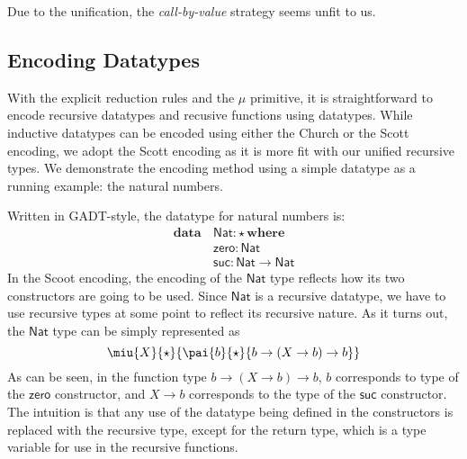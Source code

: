 Due to the unification, the \emph{call-by-value} strategy seems unfit to us. 

\subsection{Encoding Datatypes}


\newcommand{\Nat}{\mathsf{Nat}} \newcommand{\zero}{\mathsf{zero}}
\newcommand{\suc}{\mathsf{suc}} \newcommand{\plus}{\mathsf{plus}}
\newcommand{\List}{\mathsf{List}} \newcommand{\nil}{\mathsf{nil}}
\newcommand{\cons}{\mathsf{cons}}
\newcommand{\length}{\mathsf{length}}
\newcommand{\case}{\mathbf{case}} \newcommand{\of}{\mathbf{of}}
\newcommand{\data}{\mathbf{data}} \newcommand{\where}{\mathbf{where}}
\newcommand{\letbb}{\mathbf{let}} \newcommand{\inb}{\mathbf{in}}

With the explicit reduction rules and the $\mu$ primitive, it is straightforward to encode recursive datatypes and recusive functions using datatypes. While inductive datatypes can be encoded using either the Church or the Scott encoding, we adopt the Scott encoding as it is more fit with our unified recursive types. We demonstrate the encoding method using a simple datatype as a running example: the natural numbers.

Written in GADT-style, the datatype for natural numbers is:
\begin{align*}
  \data\,&\Nat : \star\,\where \\
         &\zero : \Nat \\
         &\suc : \Nat \rightarrow \Nat
\end{align*}
In the Scoot encoding, the encoding of the $\Nat$ type reflects how its two constructors are going to be used. Since $\Nat$ is a recursive datatype, we have to use recursive types at some point to reflect its recursive nature. As it turns out, the $\Nat$ type can be simply represented as
\[\miu{X}{\star}{\pai{b}{\star}{b \rightarrow (X \rightarrow b) \rightarrow b}}\]
As can be seen, in the function type $b \rightarrow (X \rightarrow b) \rightarrow b$, $b$ corresponds to type of the $\zero$ constructor, and $X \rightarrow b$ corresponds to the type of the $\suc$ constructor. The intuition is that any use of the datatype being defined in the constructors is replaced with the recursive type, except for the return type, which is a type variable for use in the recursive functions.


